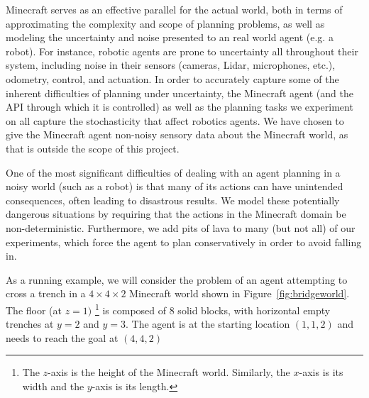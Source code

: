 \documentclass[]{article}
\newcommand{\dgnote}[1]{\textcolor{Orange}{\textbf{DG: #1}}}
\begin{document}
Minecraft serves as an effective parallel for the actual world, both in terms of
approximating the complexity and scope of planning problems,
as well as modeling the uncertainty and noise presented to an real world agent (e.g. a robot).
For instance, robotic agents are prone to uncertainty all throughout their system, including noise in their sensors
(cameras, Lidar, microphones, etc.), odometry, control, and actuation.
In order to accurately capture some of the inherent difficulties of planning under
uncertainty, the Minecraft agent (and the API through which it is controlled) as well as
the planning tasks we experiment on all capture the stochasticity that affect robotics agents.
We have chosen to give the Minecraft agent non-noisy sensory 
data about the Minecraft world, as that is outside the scope of this project. %

One of the most significant difficulties of dealing with an agent planning in a noisy world (such as a robot) is that many of its actions
can have unintended consequences, often leading to disastrous results. We
model these potentially dangerous situations by requiring that the actions in the
Minecraft domain be non-deterministic. Furthermore, we add pits of lava to many (but not all)
of our experiments, which force the agent to plan conservatively in order to avoid
falling in.

As a running example, we will consider the problem of an agent attempting
to cross a trench in a $4 \times 4 \times 2$ Minecraft world shown in
Figure~\ref{fig:bridgeworld}. The floor (at $z = 1)$ \footnote{The
  $z$-axis is the height of the Minecraft world. Similarly, the
  $x$-axis is its width and the $y$-axis is its length.} is composed
of 8 solid blocks, with horizontal empty trenches at $y = 2$ and $y =
3$. The agent is at the starting location $(1, 1, 2)$ and needs to
reach the goal at $(4,4,2)$
\end{document}

